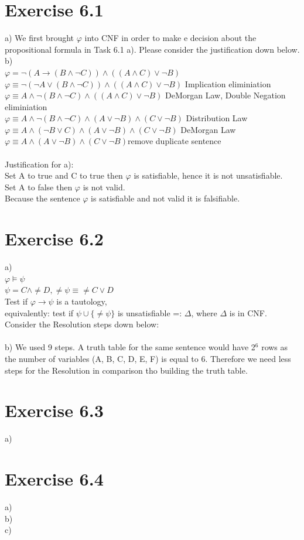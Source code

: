 \documentclass[12pt]{article}
\begin{document}
\section*{Exercise 6.1}
a) We first brought $\varphi$ into CNF in order to make e decision about the propositional formula in Task 6.1 a). Please consider the justification down below.\\
b) \\
$\varphi = \lnot (A \to (B \land \lnot C)) \land ((A \land C ) \lor \lnot B)$\\
$\varphi \equiv \lnot (\lnot A \lor (B \land \lnot C)) \land ((A \land C) \lor \lnot B)$ \qquad Implication eliminiation\\
$\varphi \equiv A \land \lnot (B \land \lnot C) \land ((A \land C) \lor \lnot B)$ \qquad DeMorgan Law, Double Negation eliminiation\\
$\varphi \equiv A \land \lnot (B \land \lnot C) \land (A \lor \lnot B) \land (C \lor \lnot B)$ \qquad Distribution Law\\
$\varphi \equiv A \land (\lnot B \lor C) \land (A \lor \lnot B) \land (C \lor \lnot B)$ \qquad DeMorgan Law\\
$\varphi \equiv A \land (A \lor \lnot B) \land (C \lor \lnot B)$\qquad remove duplicate sentence\\ \\
Justification for a):\\
Set A to true and C to true then $\varphi$ is satisfiable, hence it is not unsatisfiable.\\
Set A to false then $\varphi$ is not valid.\\
Because the sentence $\varphi$ is satisfiable and not valid it is falsifiable.


\section*{Exercise 6.2}
a)\\
$\varphi \vDash \psi$\\
$\psi = C \land \neq D, \neq \psi \equiv \neq C \lor D$\\
Test if $\varphi \to \psi$ is a tautology,\\
equivalently: test if $\psi \cup \{\neq \psi \}$ is unsatisfiable =: $\Delta$, where $\Delta$ is in CNF.\\
Consider the Resolution steps down below:\\ \\
b) We used 9 steps. A truth table for the same sentence would have 2$^6$ rows as the number of variables (A, B, C, D, E, F) is equal to 6. Therefore we need less steps for the Resolution in comparison tho building the truth table.\\


\section*{Exercise 6.3}
a) \\

\section*{Exercise 6.4}
a) \\
b) \\
c) \\
\end{document}
